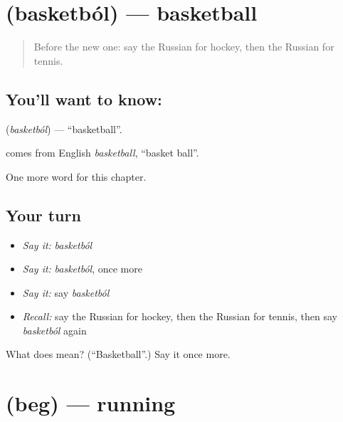 \section[\texorpdfstring{\ru{баскетбол} (basketból)}{баскетбол (basketból)}]{ (basketból) — basketball}

\label{lesson:RU-C252-basketbol}



\begin{quote}
Before the new one: say the Russian for hockey, then the Russian for tennis.
\end{quote}

\subsection*{You'll want to know: }
\textbf{} (\emph{basketból}) — \textquotedblleft{}basketball\textquotedblright{}.

\begin{cousinweb}
\textbf{} comes from English \emph{basketball}, \textquotedblleft{}basket ball\textquotedblright{}.
\end{cousinweb}

\begin{grammarlens}[title={What you've built}]
One more word for this chapter.
\end{grammarlens}

\subsection*{Your turn}
\begin{itemize}
\raggedright
  \item \emph{Say it:} \emph{basketból}
  \item \emph{Say it:} \emph{basketból}, once more
  \item \emph{Say it:} say \emph{basketból}
  \item \emph{Recall:} say the Russian for hockey, then the Russian for tennis, then say \emph{basketból} again
\end{itemize}

\begin{tcolorbox}[breakable,colback=teal!4,colframe=teal!35!black,title={Before you move on}]
What does  mean? (\textquotedblleft{}Basketball\textquotedblright{}.) Say it once more.
\end{tcolorbox}
\section[\texorpdfstring{\ru{бег} (beg)}{бег (beg)}]{ (beg) — running}

